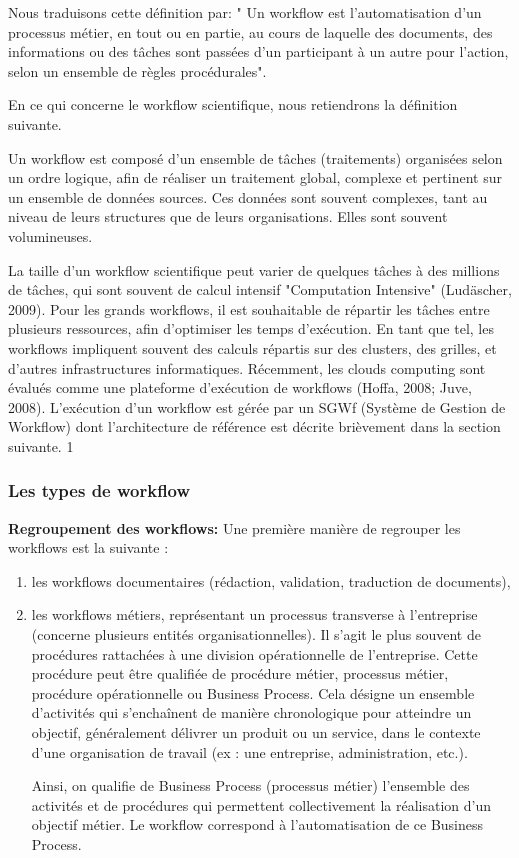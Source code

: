 Nous traduisons cette définition par: " Un workflow est l'automatisation d'un processus métier, en tout ou en partie, au cours de laquelle des documents, des informations ou des tâches sont passées d'un participant à un autre pour l'action, selon un ensemble de règles procédurales". 

En ce qui concerne le workflow scientifique, nous retiendrons la définition suivante. 

Un workflow est composé d’un ensemble de tâches (traitements) organisées selon un ordre logique, afin de réaliser un traitement global, complexe et pertinent sur un ensemble de données sources. Ces données sont souvent complexes, tant au niveau de leurs structures que de leurs organisations. Elles sont souvent volumineuses.

La taille d’un workflow scientifique peut varier de quelques tâches à des millions de tâches, qui sont souvent de calcul intensif "Computation Intensive" (Ludäscher, 2009).  Pour les grands workflows, il est souhaitable de répartir les tâches entre plusieurs ressources, afin d’optimiser les temps d’exécution. En tant que tel, les workflows impliquent souvent  des calculs répartis sur des clusters, des grilles, et d'autres infrastructures informatiques. Récemment, les clouds computing  sont évalués comme une plateforme d'exécution de workflows (Hoffa, 2008; Juve, 2008). L’exécution d’un workflow est gérée par un SGWf (Système de Gestion de Workflow) dont l’architecture de référence est décrite brièvement dans la section suivante. 
1


\subsubsection{Les types de workflow}
\textbf{Regroupement des workflows:}
Une première manière de regrouper les workflows est la suivante :
\begin{enumerate}

	\item les workflows documentaires (rédaction, validation, traduction de documents),
	\item les workflows métiers, représentant un processus transverse à l'entreprise (concerne plusieurs entités organisationnelles). Il s'agit le plus souvent de procédures rattachées à une division opérationnelle de l'entreprise. Cette procédure peut être qualifiée de procédure métier, processus métier, procédure opérationnelle ou Business Process. Cela désigne un ensemble d'activités qui s'enchaînent de manière chronologique pour atteindre un objectif, généralement délivrer un produit ou un service, dans le contexte d'une organisation de travail (ex : une entreprise, administration, etc.).
	
	Ainsi, on qualifie de Business Process (processus métier) l'ensemble des activités et de procédures qui permettent collectivement la réalisation d'un objectif métier. Le workflow correspond à l'automatisation de ce Business Process.
	
	
\end{enumerate}

